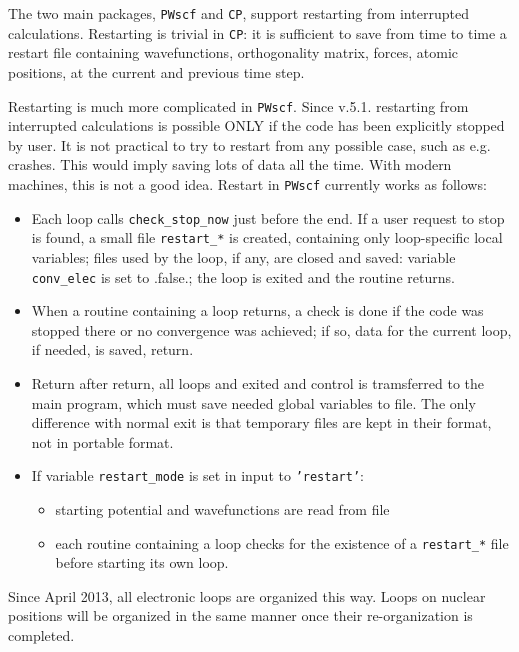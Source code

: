 \documentclass[12pt,a4paper]{article}
\begin{document}
The two main packages, \texttt{PWscf} and \texttt{CP}, support
restarting from interrupted calculations. Restarting is trivial
in \texttt{CP}: it is sufficient to save from time to time a
restart file containing wavefunctions, orthogonality matrix,
forces, atomic positions, at the current and previous time step.

Restarting is much more complicated in  \texttt{PWscf}. Since v.5.1.
restarting from interrupted calculations is possible ONLY if the code
has been explicitly stopped by user. It is not practical to try to
restart from any possible case, such as e.g. crashes. This would
imply saving lots of data all the time. With modern machines, this is
not a good idea. Restart in  \texttt{PWscf} currently works as follows:
\begin{itemize}
\item Each loop calls \texttt{check\_stop\_now} just before the end.
  If a user request to stop is found, a small file \texttt{restart\_*}
  is created, containing only loop-specific local variables;
  files used by the loop, if any, are closed and saved:
  variable \texttt{conv\_elec} is set to .false.;
  the loop is exited and the routine returns.
\item When a routine containing a loop returns, a check is done 
  if the code was stopped there or no convergence was achieved;
  if so, data for the current loop, if needed, is saved, return.
\item Return after return, all loops and exited and control is
  tramsferred to the main program, which must save needed global
  variables to file. The only difference with normal exit is that
  temporary files are kept in their format, not in portable format.
\item If variable \texttt{restart\_mode} is set in input to
  \texttt{'restart'}:
  \begin{itemize}
  \item starting potential and wavefunctions are read from file
  \item each routine containing a loop checks for the existence of a
    \texttt{restart\_*} file before starting its own loop.
  \end{itemize}
\end{itemize}
Since April 2013, all electronic loops are organized this way. Loops
on nuclear positions will be organized in the same manner once their
re-organization is completed.
\end{document}
